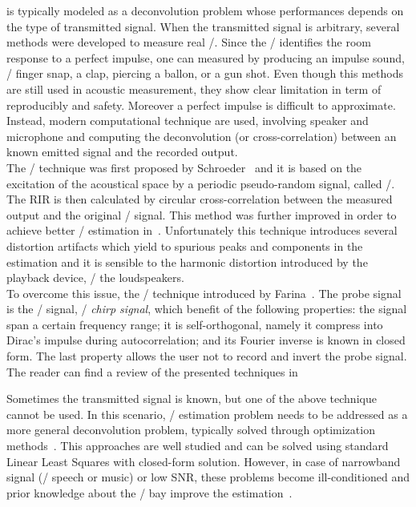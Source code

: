  is typically modeled as a deconvolution problem whose performances depends on the type of transmitted signal.
When the transmitted signal is arbitrary, several methods were developed to measure real \RIRs/.
Since the \RIR/ identifies the room response to a perfect impulse, one can measured by producing an impulse sound, \eg/ finger snap, a clap, piercing a ballon, or a gun shot.
Even though this methods are still used in acoustic measurement, they show clear limitation in term of reproducibly and safety.
Moreover a perfect impulse is difficult to approximate.
Instead, modern computational technique are used, involving speaker and microphone and computing the deconvolution (or cross-correlation) between an known emitted signal and the recorded output.
\\The \MLSdef/ technique was first proposed by Schroeder~ and it is based on the excitation of the acoustical space by a periodic pseudo-random signal, called \MLS/.
The RIR is then calculated by circular cross-correlation between the measured output and the original \MLS/ signal.
This method was further improved in order to achieve better \RIR/ estimation in~.
Unfortunately this technique introduces several distortion artifacts which yield to spurious peaks and components in the estimation and it is sensible to the harmonic distortion introduced by the playback device, \eg/ the loudspeakers.
\\To overcome this issue, the \ESSdef/ technique introduced by Farina~.
The probe signal is the \ESS/ signal, \aka/ \textit{chirp signal}, which benefit of the following properties:
the signal span a certain frequency range; it is self-orthogonal, namely it compress into Dirac's impulse during autocorrelation; and its Fourier inverse is known in closed form.
The last property allows the user not to record and invert the probe signal.
The reader can find a review of the presented techniques in~

\mynewline
Sometimes the transmitted signal is known, but one of the above technique cannot be used.
In this scenario, \RIR/ estimation problem needs to be addressed as a more general deconvolution problem, typically solved through optimization methods~.
This approaches are well studied and can be solved using standard Linear Least Squares with closed-form solution.
However, in case of narrowband signal (\eg/ speech or music) or low SNR, these problems become ill-conditioned and prior knowledge about the \RIR/ bay improve the estimation~.

